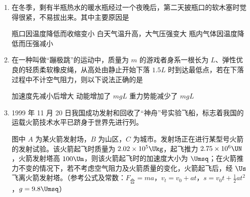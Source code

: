 \documentclass[\gkver]{gaokaozhenti}
\begin{document}
\begin{enumerate}

\item
在冬季，剩有半瓶热水的暖水瓶经过一个夜晚后，第二天披瓶口的软木塞时觉得很紧，不易拔出来。其中主要原因是

{瓶口因温度降低而收缩变小}
{白天气温升高，大气压强变大}
{瓶内气体因温度降低而压强减小}


\item
在一种叫做“蹦极跳”的运动中，质量为 $m$ 的游戏者身系一根长为 $L$、弹性优良的轻质柔软橡皮绳，从高处由静止开始下落 $1.5L$ 时到达最低点，若在下落过程中不计空气阻力，则以下说法正确的是

{加速度先减小后增大}
{动能增加了 $mgL$}
{重力势能减少了 $mgL$}


\item
1999 年 11 月 20 日我国成功发射和回收了“神舟”号实验飞船，标志着我国的运载火箭技术水平已跻身于世界先进行列。

图中 $A$ 为某火箭发射场，$B$ 为山区，$C$ 为城市。发射场正在进行某型号火箭的发射试验。该火箭起飞时质量为 $2.02\times10^{5}\Ukg$，起飞推力 $2.75\times10^{6}\UN$，火箭发射塔高 $100\Um$，则该火箭起飞时的加速度大小为 $\Umsq$；在火箭推力不变的情况下，若不考虑空气阻力及火箭质量的变化，火箭起飞后，经 $\Us$ 飞离火箭发射塔。（参考公式及常数：$F_{\text{合}}=ma$，$v_{t}=v_{0}+at$，$s=v_{0}t+\frac{1}{2}at^{2}$，$g=9.8\Umsq$）


\end{enumerate}
\end{document}
